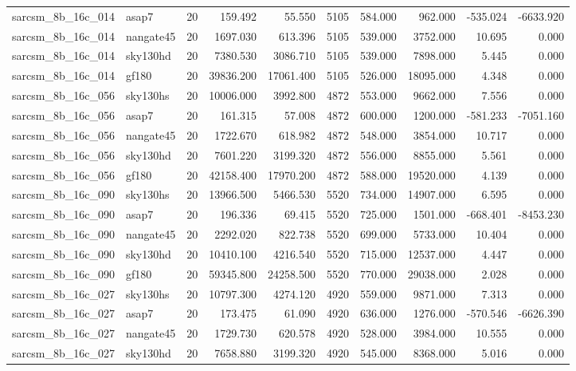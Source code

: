 \begin{longtable}{llrrrrrrrr}
sarcsm\_8b\_16c\_014 & asap7 & 20 & 159.492 & 55.550 & 5105 & 584.000 & 962.000 & -535.024 & -6633.920 \\
sarcsm\_8b\_16c\_014 & nangate45 & 20 & 1697.030 & 613.396 & 5105 & 539.000 & 3752.000 & 10.695 & 0.000 \\
sarcsm\_8b\_16c\_014 & sky130hd & 20 & 7380.530 & 3086.710 & 5105 & 539.000 & 7898.000 & 5.445 & 0.000 \\
sarcsm\_8b\_16c\_014 & gf180 & 20 & 39836.200 & 17061.400 & 5105 & 526.000 & 18095.000 & 4.348 & 0.000 \\
sarcsm\_8b\_16c\_056 & sky130hs & 20 & 10006.000 & 3992.800 & 4872 & 553.000 & 9662.000 & 7.556 & 0.000 \\
sarcsm\_8b\_16c\_056 & asap7 & 20 & 161.315 & 57.008 & 4872 & 600.000 & 1200.000 & -581.233 & -7051.160 \\
sarcsm\_8b\_16c\_056 & nangate45 & 20 & 1722.670 & 618.982 & 4872 & 548.000 & 3854.000 & 10.717 & 0.000 \\
sarcsm\_8b\_16c\_056 & sky130hd & 20 & 7601.220 & 3199.320 & 4872 & 556.000 & 8855.000 & 5.561 & 0.000 \\
sarcsm\_8b\_16c\_056 & gf180 & 20 & 42158.400 & 17970.200 & 4872 & 588.000 & 19520.000 & 4.139 & 0.000 \\
sarcsm\_8b\_16c\_090 & sky130hs & 20 & 13966.500 & 5466.530 & 5520 & 734.000 & 14907.000 & 6.595 & 0.000 \\
sarcsm\_8b\_16c\_090 & asap7 & 20 & 196.336 & 69.415 & 5520 & 725.000 & 1501.000 & -668.401 & -8453.230 \\
sarcsm\_8b\_16c\_090 & nangate45 & 20 & 2292.020 & 822.738 & 5520 & 699.000 & 5733.000 & 10.404 & 0.000 \\
sarcsm\_8b\_16c\_090 & sky130hd & 20 & 10410.100 & 4216.540 & 5520 & 715.000 & 12537.000 & 4.447 & 0.000 \\
sarcsm\_8b\_16c\_090 & gf180 & 20 & 59345.800 & 24258.500 & 5520 & 770.000 & 29038.000 & 2.028 & 0.000 \\
sarcsm\_8b\_16c\_027 & sky130hs & 20 & 10797.300 & 4274.120 & 4920 & 559.000 & 9871.000 & 7.313 & 0.000 \\
sarcsm\_8b\_16c\_027 & asap7 & 20 & 173.475 & 61.090 & 4920 & 636.000 & 1276.000 & -570.546 & -6626.390 \\
sarcsm\_8b\_16c\_027 & nangate45 & 20 & 1729.730 & 620.578 & 4920 & 528.000 & 3984.000 & 10.555 & 0.000 \\
sarcsm\_8b\_16c\_027 & sky130hd & 20 & 7658.880 & 3199.320 & 4920 & 545.000 & 8368.000 & 5.016 & 0.000 \\

\end{longtable}
